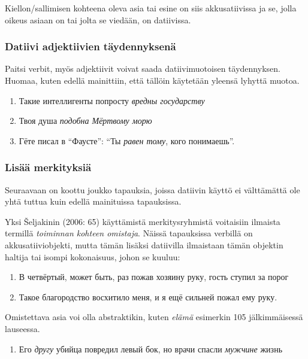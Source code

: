 \documentclass[]{scrartcl}
\providecommand{\tightlist}{%
  \setlength{\itemsep}{0pt}\setlength{\parskip}{0pt}}
\begin{document}
Kiellon/sallimisen kohteena oleva asia tai esine on siis akkusatiivissa
ja se, jolla oikeus asiaan on tai jolta se viedään, on datiivissa.

\subsubsection{Datiivi adjektiivien
täydennyksenä}\label{datiivi-adjektiivien-tuxe4ydennyksenuxe4}

Paitsi verbit, myös adjektiivit voivat saada datiivimuotoisen
täydennyksen. Huomaa, kuten edellä mainittiin, että tällöin käytetään
yleensä lyhyttä muotoa.

\begin{enumerate}
\def\labelenumi{(\arabic{enumi})}
\setcounter{enumi}{99}
\tightlist
\item
  Такие интеллигенты попросту \emph{вредны государству}
\item
  Твоя душа \emph{подобна Мёртвому морю}
\item
  Гёте писал в ``Фаусте'': ``Ты \emph{равен тому}, кого понимаешь''.
\end{enumerate}

\subsubsection{Lisää merkityksiä}\label{lisuxe4uxe4-merkityksiuxe4}

Seuraavaan on koottu joukko tapauksia, joissa datiivin käyttö ei
välttämättä ole yhtä tuttua kuin edellä mainituissa tapauksissa.

Yksi Šeljakinin (2006: 65) käyttämistä merkitysryhmistä voitaisiin
ilmaista termillä \emph{toiminnan kohteen omistaja}. Näissä tapauksissa
verbillä on akkusatiiviobjekti, mutta tämän lisäksi datiivilla
ilmaistaan tämän objektin haltija tai isompi kokonaisuus, johon se
kuuluu:

\begin{enumerate}
\def\labelenumi{(\arabic{enumi})}
\setcounter{enumi}{102}
\tightlist
\item
  В четвёртый, может быть, раз пожав хозяину руку, гость ступил за порог
\item
  Такое благородство восхитило меня, и я ещё сильней пожал ему руку.
\end{enumerate}

Omistettava asia voi olla abstraktikin, kuten \emph{elämä} esimerkin 105
jälkimmäisessä lauseessa.

\begin{enumerate}
\def\labelenumi{(\arabic{enumi})}
\setcounter{enumi}{104}
\tightlist
\item
  Его \emph{другу} убийца повредил левый бок, но врачи спасли
  \emph{мужчине} жизнь
\end{enumerate}
\end{document}
